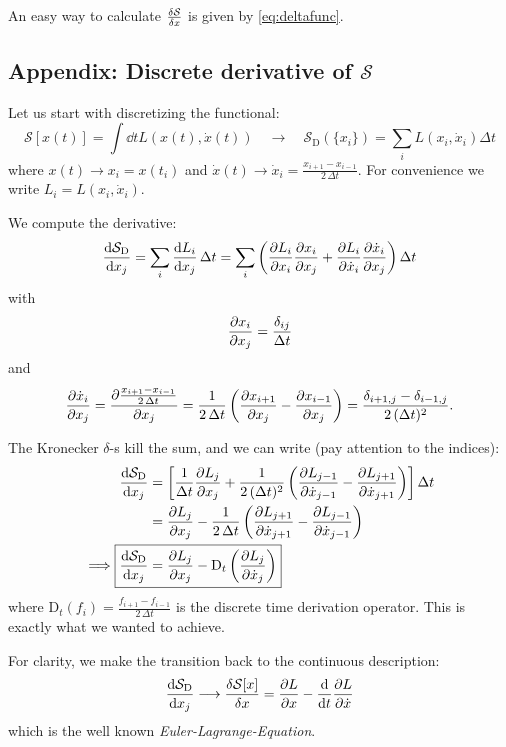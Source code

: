 \documentclass[11pt,a4paper]{scrartcl}
\newcommand{\action}{\ensuremath{\mathcal{S}}}
\newcommand{\SD}{\ensuremath{\mathcal{S}_{\mathrm{D}}}}
\newcommand{\xdoti}{\ensuremath{\dot{x}_i}}
\newcommand{\xdotj}{\ensuremath{\dot{x}_j}}
\newcommand{\xdotjm}{\ensuremath{\dot{x}_{j-1}}}
\newcommand{\deltaij}{\ensuremath{\delta_{ij}}}
\newcommand{\OverDeltaT}[1]{\ensuremath{\frac{#1}{\Delta t}}}
\newcommand{\DT}{\ensuremath{\mathrm{D}_t}}
\newcommand{\OverTwoDeltaT}[1]{\ensuremath{\frac{#1}{2\, \Delta t}}}
\newcommand{\xdotjp}{\ensuremath{\dot{x}_{j+1}}}
\begin{document}
An easy way to calculate $\fdv{\action}{x}$ is given by \cref{eq:deltafunc}.


\newpage


\subsection{Appendix: Discrete derivative of $\action$}

Let us start with discretizing the functional:
\begin{equation*}
    \mathcal{S}\left[x(t)\right] = \int\dd{t}L\left(x(t), \dot{x}(t)\right)
    \quad\longrightarrow\quad
    \SD\left(\{x_i\}\right) = \sum_i L\left(x_i, \xdoti\right)\Delta t
\end{equation*}
where $x(t) \longrightarrow x_i = x(t_i)$ and $\dot{x}(t) \longrightarrow
\xdoti = \OverTwoDeltaT{x_{i+1}-x_{i-1}}$. For convenience we write $L_i = L(x_i, \xdoti)$.

We compute the derivative:
\begin{equation*}
    \dv{\SD}{x_j} =\sum_i\dv{L_i}{x_j}\,\Delta t
    =\sum_i\left(\pdv{L_i}{x_i}\pdv{x_i}{x_j}+\pdv{L_i}{\xdoti}\pdv{\xdoti}{x_j}\right)
    \Delta t
\end{equation*}
with
\begin{equation*}
    \pdv{x_i}{x_j}=\OverDeltaT{\deltaij}
\end{equation*}
and
\begin{align*}
    \pdv{\xdoti}{x_j}=\pdv{\OverTwoDeltaT{x_{i+1}-x_{i-1}}}{x_j}
    =\OverTwoDeltaT{1}\left(\pdv{x_{i+1}}{x_j}-\pdv{x_{i-1}}{x_j}\right)
    =\frac{\delta_{i+1,j}-\delta_{i-1,j}}{2\,(\Delta t)^2}.
\end{align*}

The Kronecker $\delta$-s kill the sum, and we can write (pay attention to the indices):
\begin{align*}
    \dv{\SD}{x_j}&=\left[\OverDeltaT{1}\pdv{L_j}{x_j}+\frac{1}{2\,(\Delta{t})^2}
    \left(\pdv{L_{j-1}}{\xdotjm}-\pdv{L_{j+1}}{\xdotjp}\right)\right]\Delta{t}\\
    &=\pdv{L_j}{x_j}-\OverTwoDeltaT{1}\left(\pdv{L_{j+1}}{\xdotjp}-\pdv{L_{j-1}}{\xdotjm}\right)\\
    \implies\Aboxed{\dv{\SD}{x_j}&=\pdv{L_j}{x_j}-\DT\left(\pdv{L_{j}}{\xdotj}\right)}
\end{align*}
where $\DT(f_i)=\OverTwoDeltaT{f_{i+1}-f_{i-1}}$ is the discrete time derivation
operator.
This is exactly what we wanted to achieve.

For clarity, we make the transition back to the continuous description:
\begin{equation*}
    \dv{\SD}{x_j}\longrightarrow\fdv{\mathcal{S}[x]}{x}=\pdv{L}{x}-\dv{t}\pdv{L}{\dot{x}}
\end{equation*}
which is the well known \emph{Euler-Lagrange-Equation}.
\end{document}
